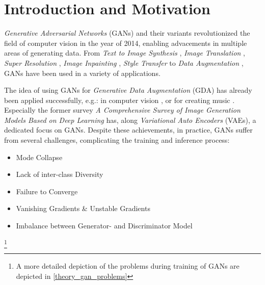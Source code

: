 \section{Introduction and Motivation}\label{introduction_and_motivation}
\pagestyle{fancy}
\textit{Generative Adversarial Networks} (GANs) \cite{goodfellow2014generativeadversarialnetworks} and their variants revolutionized the field of computer vision in the year of 2014, enabling advacements in multiple areas of generating data. From \textit{Text to Image Synthesis} \cite{reed2016generativeadversarialtextimage}, \textit{Image Translation} \cite{isola2018imagetoimagetranslationconditionaladversarial}, \textit{Super Resolution} \cite{ledig2017photorealisticsingleimagesuperresolution}, \textit{Image Inpainting} \cite{pathak2016contextencodersfeaturelearning}, \textit{Style Transfer} \cite{wang2023multimodalityguidedimagestyletransfer} to \textit{Data Augmentation} \cite{shorten2019survey}, GANs have been used in a variety of applications.

The idea of using GANs for \textit{Generative Data Augmentation} (GDA) has already been applied successfully, e.g.: in computer vision \cite{Li2025comprehensivesurvedeepimages}, \cite{biswas2023generativeadversarialnetworksdata} or for creating music \cite{ji2020comprehensivesurveydeepmusic}. Especially the former survey \textit{A Comprehensive Survey of Image Generation Models Based on Deep Learning} has, along \textit{Variational Auto Encoders} (VAEs), a dedicated focus on GANs. Despite these achievements, in practice, GANs suffer from several challenges, complicating the training and inference process:

\begin{itemize}\label{problems_of_gans}
    \setlength{\itemsep}{-5pt}
    \item Mode Collapse
    \item Lack of inter-class Diversity
    \item Failure to Converge
    \item Vanishing Gradients \& Unstable Gradients
    \item Imbalance between Generator- and Discriminator Model
\end{itemize} \footnote{A more detailed depiction of the problems during training of GANs are depicted in \ref{theory_gan_problems}}

